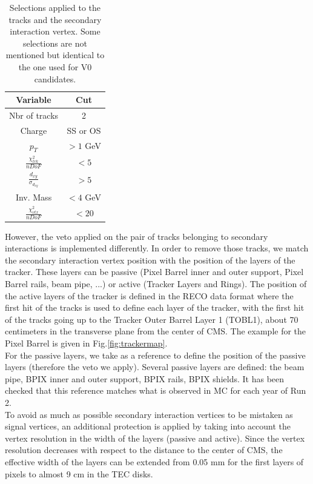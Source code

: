 \documentclass{cernatlasnote}
\begin{document}
    \begin{table}
        \centering
        \begin{tabular}{|c|c|}
        \hline
        \rowcolor{lightgray} 
           Variable  &  Cut\\
            \hline
            Nbr of tracks & 2 \\
            \hline
              Charge & SS or OS\\
             \hline
            $p_T$ & $>1$ GeV\\
            \hline
            $\frac{\chi^{2}_{trk}}{nDoF}$  & $<5$\\
            \hline
            $\frac{d_{xy}}{\sigma_{d_{xy}}}$ & $>5$\\
            \hline
             Inv. Mass & $<4$ GeV\\
            \hline
              $\frac{\chi^{2}_{vtx}}{nDoF}$ & $<20$\\
             \hline
        \end{tabular}
        \caption{Selections applied to the tracks and the secondary interaction vertex. Some selections are not mentioned but identical to the one used for V0 candidates.}
        \label{tab:SECINTSEL}
    \end{table}
            However, the veto applied on the pair of tracks belonging to secondary interactions is implemented differently.  In order to remove those tracks, we match the secondary interaction vertex position with the position of the layers of the tracker. These layers can be passive (Pixel Barrel inner and outer support, Pixel Barrel rails, beam pipe, ...) or active (Tracker Layers and Rings). The position of the active layers of the tracker is defined in the RECO data format where the first hit of the tracks is used to define each layer of the tracker, with the first hit of the tracks going up to the Tracker Outer Barrel Layer 1 (TOBL1), about 70 centimeters in the transverse plane from the center of CMS. The example for the Pixel Barrel is given in Fig.\ref{fig:trackermap}.\\
            For the passive layers, we take as a reference \cite{Sirunyan_2018} to define the position of the passive layers (therefore the veto we apply). Several passive layers are defined: the beam pipe, BPIX inner and outer support, BPIX rails, BPIX shields. It has been checked that this reference matches what is observed in MC for each year of Run 2.\\

            To avoid as much as possible secondary interaction vertices to be mistaken as signal vertices, an additional protection is applied by taking into account the vertex resolution in the width of the layers (passive and active). Since the vertex resolution decreases with respect to the distance to the center of CMS, the effective width of the layers can be extended from 0.05 mm for the first layers of pixels to almost 9 cm in the TEC disks.
            
\end{document}
